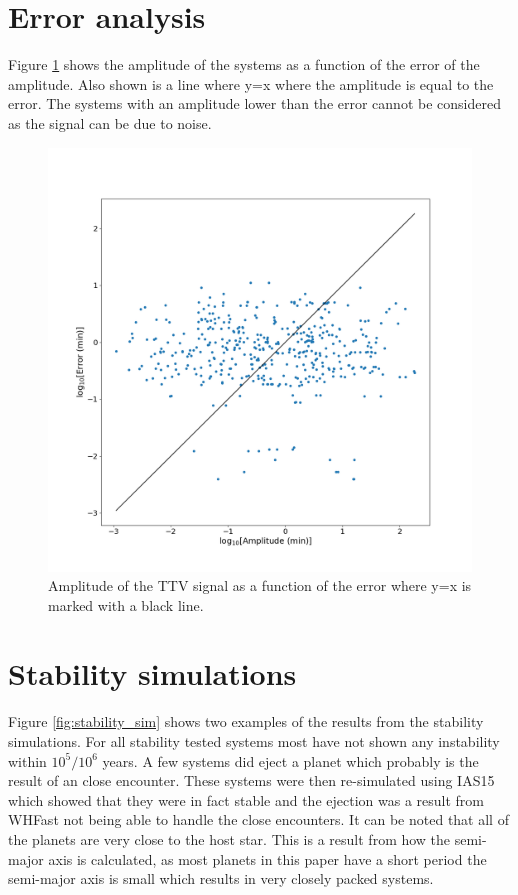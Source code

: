 \documentclass[12pt]{report}
\begin{document}
\section{Error analysis}
		Figure \ref{fig:amp_error} shows the amplitude of the systems as a function of the error of the amplitude. Also shown is a line where y=x where the amplitude is equal to the error. The systems with an amplitude lower than the error cannot be considered as the signal can be due to noise.
\begin{figure}
 	 \centering
	  \includegraphics[width=\textwidth]{img/ampErrorLog.png}
	  \caption{Amplitude of the TTV signal as a function of the error where y=x is marked with a black line.}
	 \label{fig:amp_error}
\end{figure}
\section{Stability simulations}
	Figure \ref{fig:stability_sim} shows two examples of the results from the stability simulations. For all stability tested systems most  have not shown any instability within $10^5 / 10^6$ years. A few systems did eject a planet which  probably is the result of an close encounter. These systems were then re-simulated using IAS15 which showed that they were in fact stable and the ejection was a result from WHFast not being able to handle the close encounters. It can be noted that all of the planets are very close to the host star. This is a result from how the semi-major axis is calculated, as most planets in this paper have a short period the semi-major axis is small which results in very closely packed systems.
\end{document}
